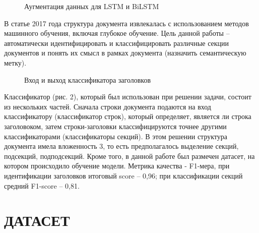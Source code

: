 \documentclass[10pt, a4paper]{ieeeconf}
\begin{document}
\begin{figure}[ht]
\caption{Аугментация данных для LSTM и BiLSTM}
\end{figure}

В статье \cite{link7} 2017 года структура документа извлекалась с использованием методов машинного обучения, включая глубокое обучение. Цель данной работы -- автоматически идентифицировать и классифицировать различные секции документов и понять их смысл в рамках документа (назначить семантическую метку).

\begin{figure}[ht]
\caption{Вход и выход классификатора заголовков}
\end{figure}

Классификатор (рис. 2), который был использован при решении задачи, состоит из нескольких частей. Сначала строки документа подаются на вход классификатору (классификатор строк), который определяет, является ли строка заголовоком, затем строки-заголовки классифицируются точнее другими классификаторами (классификаторы секций). В этом решении структура документа имела вложенность 3, то есть предполагалось выделение секций, подсекций, подподсекций.
Кроме того, в данной работе был размечен датасет, на котором происходило обучение модели. Метрика качества - F1-мера, при идентификации заголовков итоговый score -- 0,96; при классификации секций средний F1-score -- 0,81.

\section{ДАТАСЕТ}
\end{document}

